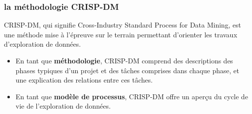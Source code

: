 \documentclass{beamer}
\begin{document}
      \begin{frame}
          \frametitle{la méthodologie CRISP-DM}
          CRISP-DM, qui signifie Cross-Industry Standard Process for Data Mining, est une méthode mise à l'épreuve sur le terrain permettant d'orienter les travaux d'exploration de données.
        \begin{itemize}
            \item En tant que \textbf{méthodologie}, CRISP-DM comprend des descriptions des phases typiques d'un projet et des tâches comprises dans chaque phase, et une explication des relations entre ces tâches.
            \item En tant que \textbf{modèle de processus}, CRISP-DM offre un aperçu du cycle de vie de l'exploration de données.
        \end{itemize}
         
      \end{frame} 
\end{document}
